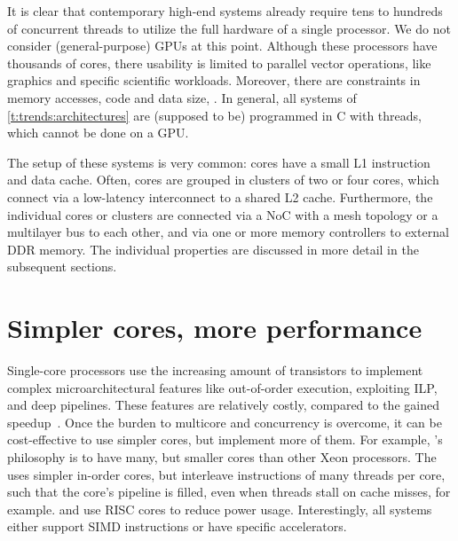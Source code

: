 It is clear that contemporary high-end systems already require tens to hundreds of concurrent threads to utilize the full hardware of a single processor.
We do not consider (general-purpose) \acp{GPU} at this point.
Although these processors have thousands of cores, there usability is limited to parallel vector operations, like graphics and specific scientific workloads.
Moreover, there are constraints in memory accesses, code and data size, \etc.
In general, all systems of \vref{t:trends:architectures} are (supposed to be) programmed in C with threads, which cannot be done on a \ac{GPU}.

The setup of these systems is very common: cores have a small L1 instruction and data cache.
Often, cores are grouped in clusters of two or four cores, which connect via a low-latency interconnect to a shared L2 cache.
Furthermore, the individual cores or clusters are connected via a \ac{NoC} with a mesh topology or a multilayer bus to each other, and via one or more memory controllers to external \ac{DDR} memory.
The individual properties are discussed in more detail in the subsequent sections.


\section{Simpler cores, more performance}

Single-core processors use the increasing amount of transistors to implement complex microarchitectural features like out-of-order execution, exploiting \ac{ILP}, and deep pipelines.
These features are relatively costly, compared to the gained speedup~\cite{borkar:future}.
Once the burden to multicore and concurrency is overcome, it can be cost-effective to use simpler cores, but implement more of them.
For example, \XeonPhi's philosophy is to have many, but smaller cores than other Xeon processors.
The \UltraSPARC uses simpler in-order cores, but interleave instructions of many threads per core, such that the core's pipeline is filled, even when threads stall on cache misses, for example.
\Epiphany and \Exynos use \ac{RISC} cores to reduce power usage.
Interestingly, all systems either support \ac{SIMD} instructions or have specific accelerators.

